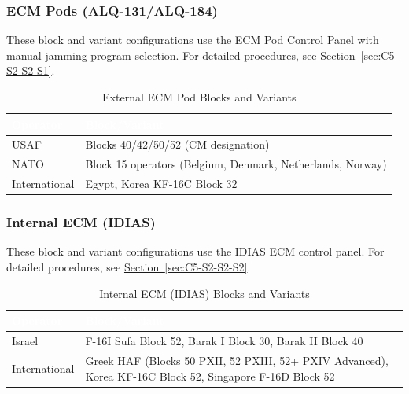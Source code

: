 \documentclass[11pt, a4paper, twoside]{report}
\newcommand{\secref}[1]{\hyperref[#1]{Section~\ref*{#1}}}
\begin{document}
\subsubsection{ECM Pods (ALQ-131/ALQ-184)}
\label{sec:C5-S3-S1-S1}

These block and variant configurations use the ECM Pod Control Panel with manual jamming program selection. For detailed procedures, see \secref{sec:C5-S2-S2-S1}.

\begin{table}[H]
\centering
\caption{External ECM Pod Blocks and Variants}
\label{tab:C5-S3-external-ecm-pods}
\small
\renewcommand{\arraystretch}{1.25}
\begin{tabular}{|>{\raggedright\arraybackslash}p{3.0cm}|>{\raggedright\arraybackslash}p{5.8cm}|}
\hline
\rowcolor{headerblue}
\textcolor{white}{\textbf{Operator}} & \textcolor{white}{\textbf{Block/Variant}} \\
\hline
USAF & Blocks 40/42/50/52 (CM designation) \\
\hline
NATO & Block 15 operators (Belgium, Denmark, Netherlands, Norway) \\
\hline
International & Egypt, Korea KF-16C Block 32 \\
\hline
\end{tabular}
\end{table}

\subsubsection{Internal ECM (IDIAS)}
\label{sec:C5-S3-S1-S2}

These block and variant configurations use the IDIAS ECM control panel. For detailed procedures, see \secref{sec:C5-S2-S2-S2}.

\begin{table}[H]
\centering
\caption{Internal ECM (IDIAS) Blocks and Variants}
\label{tab:C5-S3-internal-ecm}
\small
\renewcommand{\arraystretch}{1.25}
\begin{tabular}{|>{\raggedright\arraybackslash}p{3.0cm}|>{\raggedright\arraybackslash}p{5.8cm}|}
\hline
\rowcolor{headerblue}
\textcolor{white}{\textbf{Operator}} & \textcolor{white}{\textbf{Block/Variant}} \\
\hline
Israel & F-16I Sufa Block 52, Barak I Block 30, Barak II Block 40 \\
\hline
International & Greek HAF (Blocks 50 PXII, 52 PXIII, 52+ PXIV Advanced),
Korea KF-16C Block 52, Singapore F-16D Block 52 \\
\hline
\end{tabular}
\end{table}

\end{document}
